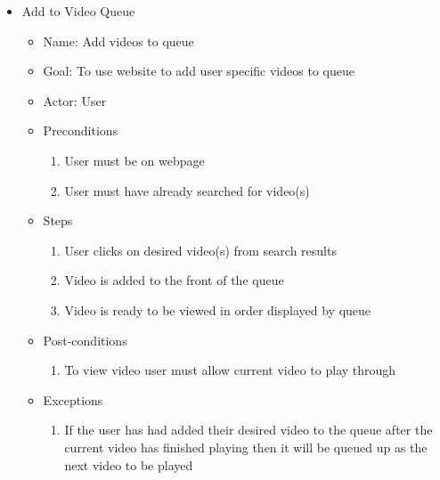 \begin{itemize}
\item Add to Video Queue
	\begin{itemize}
	\item Name: Add videos to queue
    \item Goal: To use website to add user specific videos to queue
    \item Actor: User
    \item Preconditions
		\begin{enumerate}
		\item User must be on webpage
        \item User must have already searched for video(s)
        \end{enumerate}
    \item Steps
    	\begin{enumerate}
		\item User clicks on desired video(s) from search results
        \item Video is added to the front of the queue
        \item Video is ready to be viewed in order displayed by queue
        \end{enumerate}
    \item Post-conditions
    	\begin{enumerate}
		\item To view video user must allow current video to play through
        \end{enumerate}
    \item Exceptions
    	\begin{enumerate}
    	\item If the user has had added their desired video to the queue after the current video has finished playing then it will be queued up as the next video to be played
    	\end{enumerate}
    \end{itemize}
    

\end{itemize}
